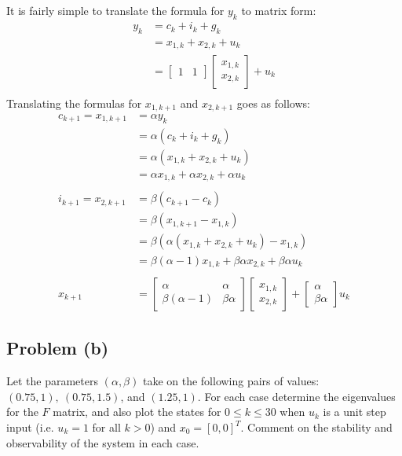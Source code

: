 \documentclass[11pt]{article}
\begin{document}
\subparagraph*{}
It is fairly simple to translate the formula for $y_k$ to matrix form:
\begin{align*}
	y_k &= c_k + i_k + g_k \\
	&= x_{1,k} + x_{2,k} + u_k \\
	&= \begin{bmatrix} 1 & 1 \end{bmatrix} \begin{bmatrix} x_{1,k} \\ x_{2,k} \end{bmatrix} + u_k \\
\end{align*}
Translating the formulas for $x_{1,k+1}$ and $x_{2,k+1}$ goes as follows:
\begin{align*}
	c_{k+1} = x_{1,k+1} &= \alpha y_k \\
	&= \alpha(c_k + i_k + g_k) \\
	&= \alpha(x_{1,k} + x_{2,k} + u_k) \\
	&= \alpha x_{1,k} + \alpha x_{2,k} + \alpha u_k \\
	\\
	i_{k+1} = x_{2,k+1} &= \beta(c_{k+1} - c_k) \\
	&= \beta(x_{1,k+1}-x_{1,k}) \\
	&= \beta(\alpha(x_{1,k} + x_{2,k} + u_k) - x_{1,k}) \\
	&= \beta(\alpha-1)x_{1,k} + \beta\alpha x_{2,k} + \beta\alpha u_k \\
	\\
	x_{k+1} &= \begin{bmatrix} \alpha & \alpha \\ \beta(\alpha-1) & \beta\alpha \end{bmatrix}\begin{bmatrix} x_{1,k} \\ x_{2,k} \end{bmatrix} + \begin{bmatrix} \alpha \\ \beta\alpha \end{bmatrix} u_k 
\end{align*}

\subsection*{Problem (b)}
Let the parameters $(\alpha,\beta)$ take on the following pairs of values: $(0.75,1),\ (0.75,1.5)$, and $(1.25,1)$. For each case determine the eigenvalues for the $F$ matrix, and also plot the states for $0\leq k\leq30$ when $u_k$ is a unit step input (i.e. $u_k=1$ for all $k>0$) and $x_0=[0,0]^T$. Comment on the stability and observability of the system in each case.
\end{document}
